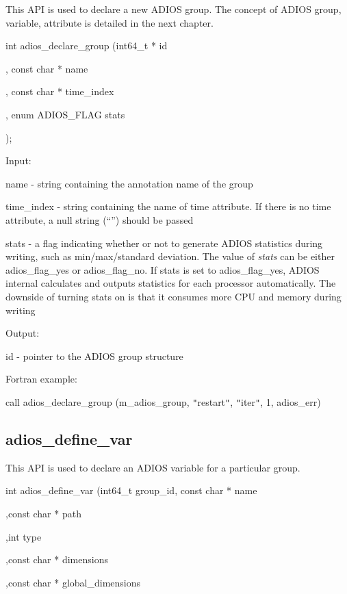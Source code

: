 \leftskip=0pt
This API is used to declare a new ADIOS group. The concept of ADIOS group, variable, 
attribute is detailed in the next chapter.

int adios\_declare\_group (int64\_t * id

\parindent=172pt
, const char * name

, const char * time\_index

\parindent=345pt
, enum ADIOS\_FLAG stats

\parindent=172pt
);

\leftskip=22pt
\parindent=0pt
Input: 

\leftskip=36pt
name - string containing the annotation name of the group 

time\_index - string containing the name of time attribute. If there is no time 
attribute, a null string (``'') should be passed

stats - a flag indicating whether or not to generate ADIOS statistics during writing, 
such as min/max/standard deviation. The value of \textit{stats} can be either adios\_flag\_yes{\Large  
}or adios\_flag\_no. If stats is set to adios\_flag\_yes, ADIOS internal calculates 
and outputs statistics for each processor automatically. The downside of turning 
stats on is that it consumes more CPU and memory during writing

\leftskip=22pt
Output: 

\leftskip=36pt
id - pointer to the ADIOS group structure

\leftskip=22pt
Fortran example: 

\parindent=13pt
call adios\_declare\_group (m\_adios\_group, \texttt{"}restart\texttt{"}, \texttt{"}iter\texttt{"}, 
1, adios\_err)\label{HToc182553359}

\subsection{adios\_define\_var}

\leftskip=0pt
\parindent=0pt
This API is used to declare an ADIOS variable for a particular group. 

\leftskip=22pt
int adios\_define\_var (int64\_t group\_id, const char * name

\parindent=122pt
,const char * path

\parindent=151pt
,int type

,const char * dimensions

\parindent=302pt
,const char * global\_dimensions

